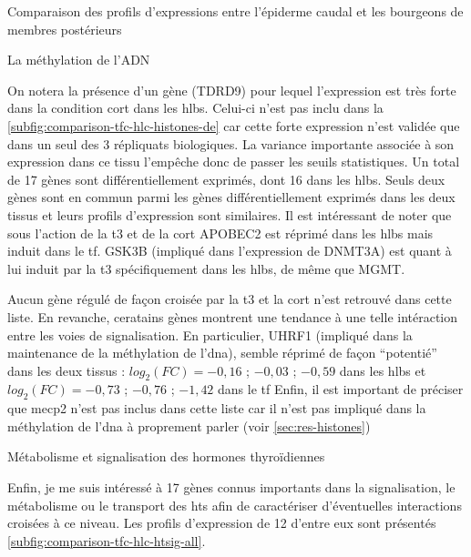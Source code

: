 \documentclass[../main.tex]{subfiles}
\begin{document}
\begin{chapter}{Comparaison des profils d'expressions entre l'épiderme caudal et les bourgeons de membres postérieurs}
\begin{section}{La méthylation de l'ADN}


On notera la présence d'un gène (TDRD9) pour lequel l'expression est très forte dans la condition \gls{cort} dans les \glspl{hlb}.
Celui-ci n'est pas inclu dans la \autoref{subfig:comparison-tfc-hlc-histones-de} car cette forte expression n'est validée que dans un seul des 3 répliquats biologiques.
La variance importante associée à son expression dans ce tissu l'empêche donc de passer les seuils statistiques.
Un total de 17 gènes sont différentiellement exprimés, dont 16 dans les \glspl{hlb}.
Seuls deux gènes sont en commun parmi les gènes différentiellement exprimés dans les deux tissus et leurs profils d'expression sont similaires.
Il est intéressant de noter que sous l'action de la \gls{t3} et de la \gls{cort} APOBEC2 est réprimé dans les \glspl{hlb} mais induit dans le \gls{tf}.
GSK3B (impliqué dans l'expression de DNMT3A) est quant à lui induit par la \gls{t3} spécifiquement dans les \glspl{hlb}, de même que MGMT.
\par
Aucun gène régulé de façon croisée par la \gls{t3} et la \gls{cort} n'est retrouvé dans cette liste.
En revanche, ceratains gènes montrent une tendance à une telle intéraction entre les voies de signalisation.
En particulier, UHRF1 (impliqué dans la maintenance de la méthylation de l'\gls{dna}), semble réprimé de façon ``potentié'' dans les deux tissus :
$log_2(FC)=-0,16$ ; $-0,03$ ; $-0,59$ dans les \glspl{hlb} et $log_2(FC)=-0,73$ ; $-0,76$ ; $-1,42$ dans le \gls{tf}
Enfin, il est important de préciser que \gls{mecp2} n'est pas inclus dans cette liste car il n'est pas impliqué dans la méthylation de l'\gls{dna} à proprement parler (voir \autoref{sec:res-histones})

\end{section}


\begin{section}{Métabolisme et signalisation des hormones thyroïdiennes}

Enfin, je me suis intéressé à 17 gènes connus importants dans la signalisation, le métabolisme ou le transport des \glspl{ht} afin de caractériser d'éventuelles interactions croisées à ce niveau.
Les profils d'expression de 12 d'entre eux sont présentés \autoref{subfig:comparison-tfc-hlc-htsig-all}.




\end{section}
\end{chapter}
\end{document}
